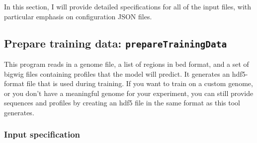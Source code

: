 \documentclass{article}
\begin{document}
In this section, I will provide detailed specifications for all of the input files, with
particular emphasis on configuration JSON files.

\newpage
\subsection{Prepare training data: \texttt{prepareTrainingData}}\label{prog:prepareTrainingData}

This program reads in a genome file, a list of regions in bed format, and a set of bigwig
files containing profiles that the model will predict.
It generates an hdf5-format file that is used during training.
If you want to train on a custom genome, or you don't have a meaningful genome for your
experiment, you can still provide sequences and profiles by creating an hdf5 file
in the same format as this tool generates.

\subsubsection{Input specification}


\end{document}
